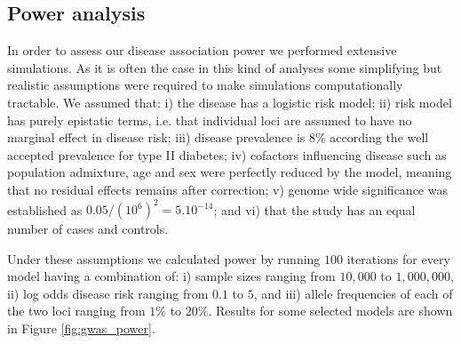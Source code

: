 
\subsection{Power analysis}

In order to assess our disease association power we performed extensive simulations.
As it is often the case in this kind of analyses some simplifying but realistic assumptions were required to make simulations computationally tractable. 
We assumed that: 
i) the disease has a logistic risk model;
ii) risk model has purely epistatic terms, i.e. that individual loci are assumed to have no marginal effect in disease risk;
iii) disease prevalence is $8\%$ according the well accepted prevalence for type II diabetes;
iv) cofactors influencing disease such as population admixture, age and sex were perfectly reduced by the model, meaning that no residual effects remains after correction;
v) genome wide significance was established as $0.05 / (10^6)^2 = 5 . 10^{-14}$;
and  
vi) that the study has an equal number of cases and controls.

Under these assumptions we calculated power by running $100$ iterations for every model having a combination of: 
i) sample sizes ranging from $10,000$ to $1,000,000$,
ii) log odds disease risk ranging from $0.1$ to $5$,
and 
iii) allele frequencies of each of the two loci ranging from $1\%$ to $20\%$.
Results for some selected models are shown in Figure \ref{fig:gwas_power}.


